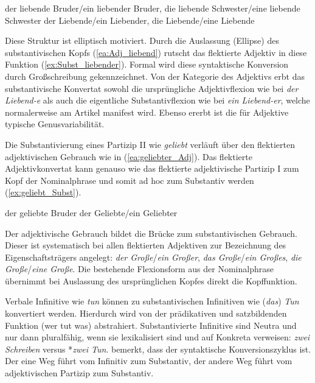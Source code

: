 \ea \label{ea:PIalsSubstantiv}
\ea \label{ea:Adj_liebend} der liebende Bruder/ein liebender Bruder, die liebende Schwester/eine liebende Schwester
\ex \label{ex:Subst_liebender} der Liebende/ein Liebender, die Liebende/eine Liebende
\z 
\z 

Diese Struktur ist elliptisch motiviert. Durch die Auslassung (Ellipse) des substantivischen Kopfs (\ref{ea:Adj_liebend}) rutscht das flektierte Adjektiv in diese Funktion (\ref{ex:Subst_liebender}). Formal wird diese syntaktische Konversion durch Großschreibung gekennzeichnet. Von der Kategorie des Adjektivs erbt das substantivische Konvertat sowohl die ursprüngliche Adjektivflexion wie bei \textit{der Liebend-e} als auch die eigentliche Substantivflexion wie bei \textit{ein Liebend-er}, welche normalerweise am Artikel manifest wird. Ebenso ererbt ist die für Adjektive typische Genusvariabilität.

Die Substantivierung eines Partizip II wie \textit{geliebt} verläuft über den flektierten adjektivischen Gebrauch wie in (\ref{ea:geliebter_Adj}). Das flektierte Adjektivkonvertat kann genauso wie das flektierte adjektivische Partizip I zum Kopf der Nominalphrase und somit ad hoc zum Substantiv werden (\ref{ex:geliebt_Subst}).

\ea \label{ea:PartizipII_Verb_Adj_Subst}
\ea \label{ea:geliebter_Adj} der geliebte Bruder
\ex \label{ex:geliebt_Subst} der Geliebte/ein Geliebter
\z 
\z 

Der adjektivische Gebrauch bildet die Brücke zum substantivischen Gebrauch. Dieser ist systematisch bei allen flektierten Adjektiven zur Bezeichnung des Eigenschaftsträgers angelegt: \textit{der Große}/\textit{ein Großer}, \textit{das Große}/\textit{ein Großes}, \textit{die Große}/\textit{eine Große}. Die bestehende Flexionsform aus der Nominalphrase übernimmt bei Auslassung des ursprünglichen Kopfes direkt die Kopffunktion.

Verbale Infinitive wie \textit{tun} können zu substantivischen Infinitiven wie (\textit{das}) \textit{Tun} konvertiert werden. Hierdurch wird von der prädikativen und satzbildenden Funktion (wer tut was) abstrahiert. Substantivierte Infinitive sind Neutra und nur dann pluralfähig, wenn sie lexikalisiert sind und auf Konkreta verweisen: \textit{zwei Schreiben} versus *\textit{zwei Tun}. \citet[307]{Eisenberg2020_Wort} bemerkt, dass der syntaktische Konversionszyklus  ist. Der eine Weg führt vom Infinitiv zum Substantiv, der andere Weg führt vom adjektivischen Partizip zum Substantiv.  

